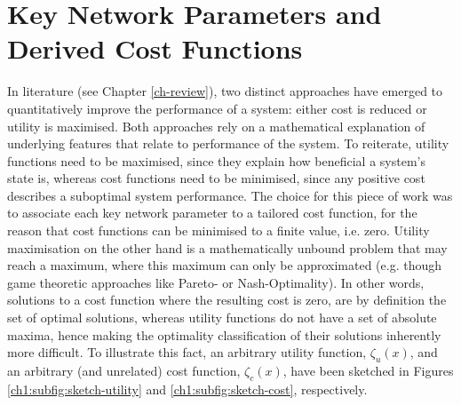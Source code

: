 \section{Key Network Parameters and Derived Cost Functions}
\label{ch1:sec:key-network-parameters}


In literature (see Chapter \ref{ch-review}), two distinct approaches have emerged to quantitatively improve the performance of a system: either cost is reduced or utility is maximised.
Both approaches rely on a mathematical explanation of underlying features that relate to performance of the system.
To reiterate, utility functions need to be maximised, since they explain how beneficial a system's state is, whereas cost functions need to be minimised, since any positive cost describes a suboptimal system performance.
The choice for this piece of work was to associate each key network parameter to a tailored cost function, for the reason that cost functions can be minimised to a finite value, i.e. zero.
Utility maximisation on the other hand is a mathematically unbound problem that may reach a maximum, where this maximum can only be approximated (e.g. though game theoretic approaches like Pareto- or Nash-Optimality).
In other words, solutions to a cost function where the resulting cost is zero, are by definition the set of optimal solutions, whereas utility functions do not have a set of absolute maxima, hence making the optimality classification of their solutions inherently more difficult.
To illustrate this fact, an arbitrary utility function, $\zeta_{u}(x)$, and an arbitrary (and unrelated) cost function, $\zeta_{c}(x)$, have been sketched in Figures \ref{ch1:subfig:sketch-utility} and \ref{ch1:subfig:sketch-cost}, respectively.



